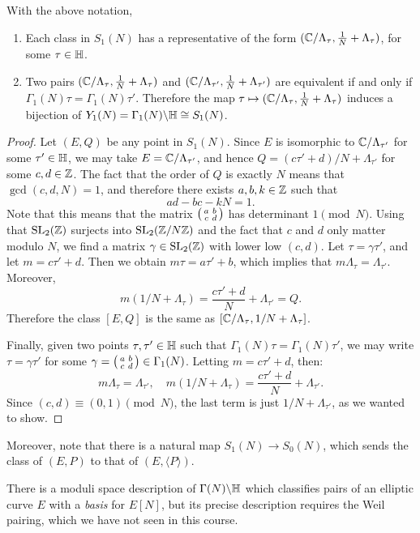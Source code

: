 \begin{theorem}
  With the above notation,
  \begin{enumerate}
  \item Each class in $S_1(N)$ has a representative of the form $(\mathbb{C}/\Lambda_\tau,\frac{1}{N} + \Lambda_\tau)$, for some $\tau\in\mathbb{H}$.
  \item Two pairs $(\mathbb{C}/\Lambda_\tau,\frac{1}{N}+\Lambda_\tau)$ and $(\mathbb{C}/\Lambda_{\tau'}, \frac{1}{N}+\Lambda_{\tau'})$ are equivalent if and only
if $\Gamma_1(N)\tau=\Gamma_1(N)\tau'$. Therefore the map $\tau\mapsto (\mathbb{C}/\Lambda_\tau, \frac 1N+\Lambda_\tau)$ induces a bijection of $Y_1(N)=\Gamma_1(N)\backslash\mathbb{H}\cong S_1(N)$.
  \end{enumerate}
\end{theorem}
\begin{proof}
  Let $(E,Q)$ be any point in $S_1(N)$. Since $E$ is isomorphic to $\mathbb{C}/\Lambda_{\tau'}$ for some $\tau'\in\mathbb{H}$, we may take $E=\mathbb{C}/\Lambda_{\tau'}$, and hence $Q=(c\tau'+d)/N + \Lambda_{\tau'}$ for some $c,d\in\mathbb{Z}$. The fact that the order of $Q$ is exactly $N$ means that $\gcd(c,d,N)=1$, and therefore there exists $a,b,k\in\mathbb{Z}$ such that
\[
ad-bc-kN=1.
\]
Note that this means that the matrix $\left(\begin{smallmatrix}a&b\\c&d\end{smallmatrix}\right)$ has determinant $1\pmod N$. Using that $\operatorname{SL}_2(\mathbb{Z})$ surjects into $\operatorname{SL}_2(\mathbb{Z}/N\mathbb{Z})$ and the fact that $c$ and $d$ only matter modulo $N$, we find a matrix $\gamma\in\operatorname{SL}_2(\mathbb{Z})$ with lower low $(c,d)$. Let $\tau=\gamma\tau'$, and let $m=c\tau'+d$. Then we obtain $m\tau=a\tau'+b$, which implies that $m\Lambda_\tau = \Lambda_{\tau'}$. Moreover,
\[
m\left(1/N+\Lambda_\tau\right) = \frac{c\tau'+d}{N}+\Lambda_{\tau'} = Q.
\]
Therefore the class $[E,Q]$ is the same as $[\mathbb{C}/\Lambda_\tau,1/N+\Lambda_\tau]$.

Finally, given two points $\tau,\tau'\in\mathbb{H}$ such that $\Gamma_1(N)\tau=\Gamma_1(N)\tau'$, we may write $\tau=\gamma\tau'$ for some $\gamma=\left(\begin{smallmatrix}a&b\\c&d\end{smallmatrix}\right)\in\Gamma_1(N)$. Letting $m=c\tau'+d$, then:
\[
m\Lambda_\tau=\Lambda_{\tau'},\quad m\left(1/N+\Lambda_\tau\right)=\frac{c\tau'+d}{N}+\Lambda_{\tau'}.
\]
Since $(c,d)\equiv(0,1)\pmod N$, the last term is just $1/N+\Lambda_{\tau'}$, as we wanted to show.
\end{proof}
Moreover, note that there is a natural map $S_1(N)\to S_0(N)$, which sends the class of $(E,P)$ to that of $(E,\langle P\rangle)$.

There is a moduli space description of $\Gamma(N)\backslash\mathbb{H}$ which classifies pairs of an elliptic curve $E$ with a \emph{basis} for $E[N]$, but its precise description requires the Weil pairing, which we have not seen in this course.


